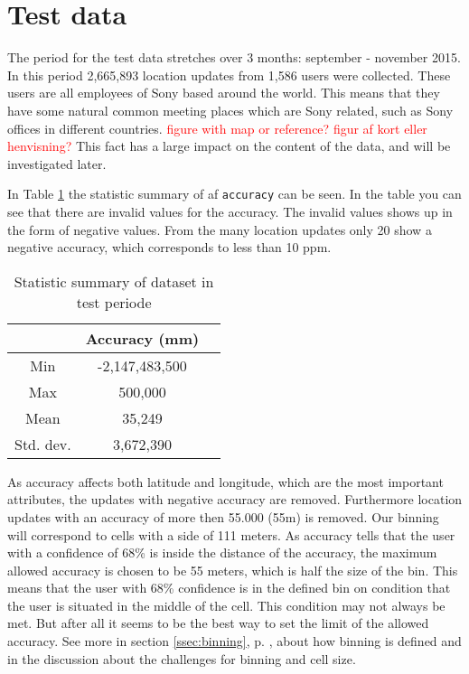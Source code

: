 \section{Test data}
The period for the test data stretches over 3 months: september - november 2015.   
In this period 2,665,893 location updates from 1,586 users were collected. These users are all employees of Sony based around the world. This means that they have some natural common meeting places which are Sony related, such as Sony offices in different countries. \textcolor{red}{figure with map or reference?} \textcolor{red}{figur af kort eller henvisning?}
This fact has a large impact on the content of the data, and will be investigated later. 


In Table \ref{tab:stat_geo_p1} the statistic summary of af \texttt{accuracy} can be seen. 
In the table you can see that there are invalid values for the accuracy. The invalid values shows up in the form of negative values. 
From the many location updates only 20 show a negative accuracy, which corresponds to less than 10 ppm.  


\begin{table}[H]
        \centering
        \small
        \setlength\tabcolsep{2pt}
        \begin{tabular}{|c|c|c|}
            \hline
                         & Accuracy (mm)          \\[0pt]%
            \hline
                 Min     &  -2,147,483,500             \\
            \hline
                 Max     &  500,000                \\
            \hline
                 Mean    & 35,249                      \\
            \hline
                Std. dev.   & 3,672,390                \\
            \hline
        \end{tabular}
        \caption{Statistic summary of dataset in test periode} %
        \label{tab:stat_geo_p1}
\end{table}

As accuracy affects both latitude and longitude, which are the most important attributes, the updates with negative accuracy are removed. Furthermore location updates with an accuracy of more then 55.000 (55m) is removed. Our binning will correspond to cells with a side of 111 meters. As accuracy tells that the user with a confidence of 68\% is inside the distance of the accuracy, the maximum allowed accuracy is chosen to be 55 meters, which is half the size of the bin. This means that the user with 68\% confidence is in the defined bin on condition that the user is situated in the middle of the cell. This condition may not always be met. But after all it seems to be the best way to set the limit of the allowed accuracy. 
See more in section \ref{ssec:binning}, p. \pageref{ssec:binning}, about how binning is defined and in the discussion about the challenges for binning and cell size. 


